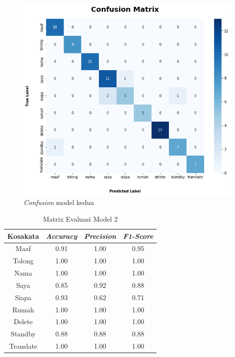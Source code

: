 \begin{figure}[H]
  \centering

  \includegraphics[scale=0.6]{gambar/bab4-uji-model-second-cf.png}

  \caption{\emph{Confusion} model kedua}
  \label{fig:model2-cf}
\end{figure}

\begin{longtable}{|c|c|c|c|}
  \caption{Matrix Evaluasi Model 2}
  \label{tb:model2stat}                                   \\
  \hline
  \rowcolor[HTML]{C0C0C0}
  \textbf{Kosakata} & \textbf{\emph{Accuracy}} & \textbf{\emph{Precision}} & \textbf{\emph{F1-Score}} \\
  \hline
  Maaf              & 0.91                        & 1.00                   & 0.95                \\
  Tolong            & 1.00                        & 1.00                   & 1.00                \\
  Nama              & 1.00                        & 1.00                   & 1.00                \\
  Saya              & 0.85                        & 0.92                   & 0.88                \\
  Siapa             & 0.93                        & 0.62                   & 0.71                \\
  Rumah             & 1.00                        & 1.00                   & 1.00                \\
  Delete            & 1.00                        & 1.00                   & 1.00                \\
  Standby           & 0.88                        & 0.88                   & 0.88                \\
  Translate         & 1.00                        & 1.00                   & 1.00                \\
  \hline
\end{longtable}

